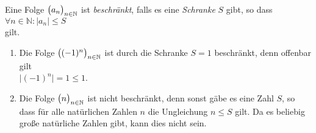 \begin{Definition}
Eine Folge $\bigl(a_n\bigr)_{n\in\mathbb{N}}$ ist \emph{beschr\"ankt}, falls es eine \emph{Schranke} $S$ gibt, so dass 
\\
\hspace*{1.3cm}
$ \forall n \in \mathbb{N}: \bigl|a_n\bigr| \leq S$
\\
gilt.  \eod
\end{Definition}

\examples
\begin{enumerate}
\item Die Folge $\bigl((-1)^n\bigr)_{n\in\mathbb{N}}$ ist durch die Schranke $S=1$ beschr\"ankt, denn offenbar gilt
      \\[0.2cm]
      \hspace*{1.3cm}
      $ \bigl|(-1)^n\bigr| = 1 \leq 1$.
\item  Die Folge $\bigl(n\bigr)_{n\in\mathbb{N}}$ ist nicht beschr\"ankt, denn sonst g\"abe es eine Zahl $S$, so dass
       f\"ur alle nat\"urlichen Zahlen $n$ die Ungleichung $n \leq S$ gilt.  Da es beliebig gro\ss{}e
       nat\"urliche Zahlen gibt, kann dies nicht sein. \eox
\end{enumerate}

